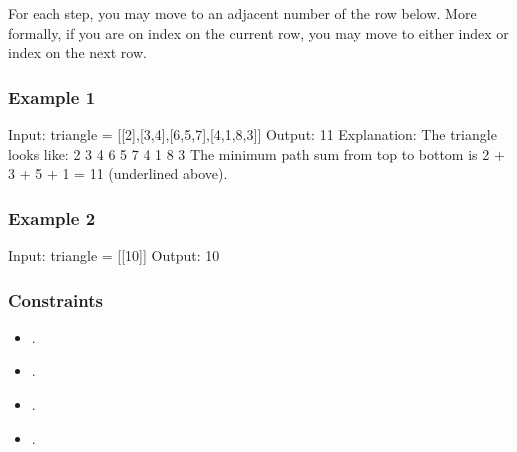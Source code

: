 \documentclass[letterpaper,12pt,english]{book}
\begin{document}
\sphinxAtStartPar
For each step, you may move to an adjacent number of the row below. More formally, if you are on index  on the current row, you may move to either index  or index  on the next row.


\subsubsection{Example 1}
\label{\detokenize{Dynamic_Programming/05_DP_120_Triangle:example-1}}
\begin{sphinxVerbatim}[commandchars=\\\{\}]
Input: triangle = [[2],[3,4],[6,5,7],[4,1,8,3]]
Output: 11
Explanation: The triangle looks like:
   2
  3 4
 6 5 7
4 1 8 3
The minimum path sum from top to bottom is 2 + 3 + 5 + 1 = 11 (underlined above).
\end{sphinxVerbatim}


\subsubsection{Example 2}
\label{\detokenize{Dynamic_Programming/05_DP_120_Triangle:example-2}}
\begin{sphinxVerbatim}[commandchars=\\\{\}]
Input: triangle = [[\PYGZhy{}10]]
Output: \PYGZhy{}10
\end{sphinxVerbatim}


\subsubsection{Constraints}
\label{\detokenize{Dynamic_Programming/05_DP_120_Triangle:constraints}}\begin{itemize}
\item {} 
\sphinxAtStartPar
{}.

\item {} 
\sphinxAtStartPar
{}.

\item {} 
\sphinxAtStartPar
{}.

\item {} 
\sphinxAtStartPar
{}.

\end{itemize}
\end{document}
